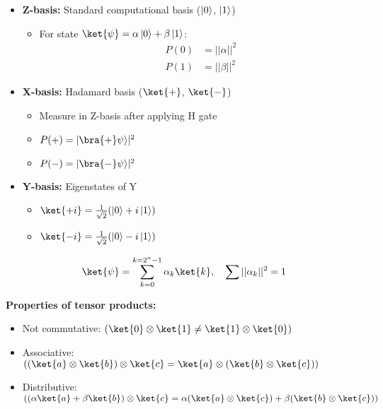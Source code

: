 \begin{itemize}
  \item \textbf{Z-basis:} Standard computational basis ($\left|0\right\rangle$, $\left|1\right\rangle$)

    \begin{itemize}
      \item For state $\ket{\psi} = \alpha\zero + \beta\one$:
        \begin{align*}
          P(0) &= ||\alpha||^2 \\
          P(1) &= ||\beta||^2
        \end{align*}
    \end{itemize}

  \item \textbf{X-basis:} Hadamard basis ($\ket{+}$, $\ket{-}$)

    \begin{itemize}[label={*}]
      \item Measure in Z-basis after applying H gate

      \item $P(+) = |\bra{+}\psi\rangle|^2$

      \item $P(-) = |\bra{-}\psi\rangle|^2$
    \end{itemize}

  \item \textbf{Y-basis:} Eigenstates of Y

    \begin{itemize}
      \item $\ket{+i} = \frac{1}{\sqrt{2}}(\zero + i\one)$

      \item $\ket{-i} = \frac{1}{\sqrt{2}}(\zero - i\one)$
    \end{itemize}

\end{itemize}


\[
  \ket{\psi} = \sum_{k=0}^{k = 2^n-1} \alpha_k \ket{k}, \quad \sum
  ||\alpha_k||^2 = 1
\]

\noindent
\textbf{Properties of tensor products:}

\begin{itemize}
  \item Not commutative: $(\ket{0} \otimes \ket{1} \neq \ket{1} \otimes
    \ket{0})$

  \item Associative: $((\ket{a} \otimes \ket{b}) \otimes \ket{c} = \ket{a}
    \otimes (\ket{b} \otimes \ket{c}))$

  \item Distributive: $((\alpha\ket{a} + \beta\ket{b}) \otimes \ket{c} =
    \alpha(\ket{a} \otimes \ket{c}) + \beta(\ket{b} \otimes \ket{c}))$
\end{itemize}


